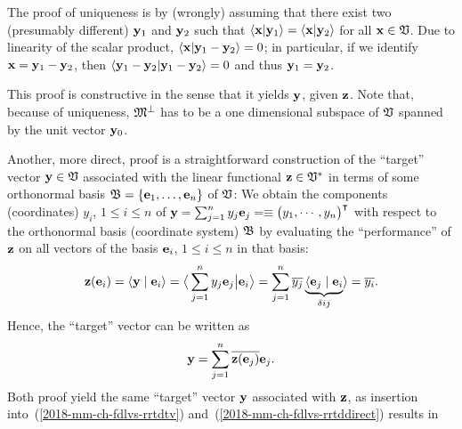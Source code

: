 {The proof of uniqueness is by (wrongly) assuming
that there exist two (presumably different) ${\bf y}_1$ and ${\bf y}_2$
such that
$
\langle {\bf x} \vert {\bf y}_1 \rangle
=
\langle {\bf x} \vert {\bf y}_2 \rangle
$ for all ${\bf x} \in {\frak V}$.
Due to linearity of the scalar product,
$
\langle  {\bf x}\vert {\bf y}_1-{\bf y}_2\rangle =0
$;
in particular, if we identify
${\bf x}={\bf y}_1-{\bf y}_2$,
then
$
\langle {\bf y}_1-{\bf y}_2 \vert {\bf y}_1-{\bf y}_2\rangle =0
$
and thus ${\bf y}_1={\bf y}_2$.

This proof is constructive in the sense that it yields ${\bf y}$, given ${\bf z}$.
Note that, because of uniqueness,
${\frak M}^\perp$ has to be a one dimensional subspace of ${\frak V}$  spanned by the unit vector ${\bf y}_0$.

Another, more direct, proof
is a straightforward construction of the ``target'' vector
${\bf y} \in {\frak V}$
associated with the linear functional
${\bf z} \in {\frak V}^\ast$
in terms of some orthonormal basis
${\frak B} = \{ {\bf e}_1, \ldots , {\bf e}_n\}$
of ${\frak V}$:
We obtain the components (coordinates) $y_i$, $1\le i\le n$  of
${\bf y} =
\sum_{j=1}^n y_j{\bf e}_j =
\equiv
\begin{pmatrix}
y_1,
\cdots ,
y_n
\end{pmatrix}^\intercal  $ with respect to the orthonormal basis (coordinate system) ${\frak B}$
by  evaluating the ``performance'' of
${\bf z} $
on all vectors of the basis ${\bf e}_i$, $1\le i\le n$ in that basis:
\begin{equation}
{\bf z}({\bf e}_i)
= \langle  {\bf y} \mid  {\bf e}_i \rangle
= \big\langle \sum_{j=1}^n y_j{\bf e}_j  \big\vert  {\bf e}_i \big\rangle
= \sum_{j=1}^n \overline{y_j}\underbrace{\langle {\bf e}_j  \mid  {\bf e}_i}_{\delta{ij}} \rangle
= \overline{y_i}
.
\label{2018-mm-ch-fdlvs-rrtddirect}
\end{equation}
Hence, the ``target'' vector can be written as
\begin{equation}
{\bf y}   =  \sum_{j=1}^n  \overline{{\bf z}({\bf e}_j)}  {\bf e}_j
.
\label{2018-mm-ch-fdlvs-rrtddirect2}
\end{equation}
Both proof yield the same ``target'' vector ${\bf y}$ associated with ${\bf z}$, as   insertion into~(\ref{2018-mm-ch-fdlvs-rrtdtv}) and~(\ref{2018-mm-ch-fdlvs-rrtddirect}) results in
}
